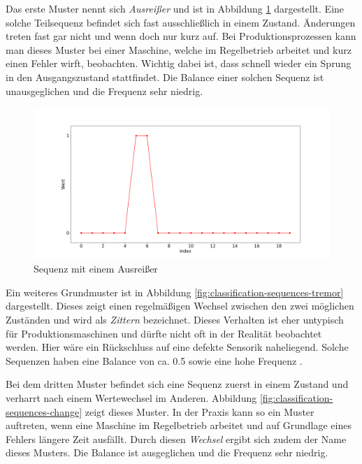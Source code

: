 Das erste Muster nennt sich \textit{Ausreißer} und ist in Abbildung \ref{fig:classification-sequences-outlier} dargestellt. Eine solche Teilsequenz befindet sich fast ausschließlich in einem Zustand. Änderungen treten fast gar nicht und wenn doch nur kurz auf. Bei Produktionsprozessen kann man dieses Muster bei einer Maschine, welche im Regelbetrieb arbeitet und kurz einen Fehler wirft, beobachten. Wichtig dabei ist, dass schnell wieder ein Sprung in den Ausgangszustand stattfindet. Die Balance einer solchen Sequenz ist unausgeglichen und die Frequenz sehr niedrig.

\begin{figure}[H]
	\centering
	\includegraphics[scale=0.32]{images/sequences/outlier}
	\caption{Sequenz mit einem Ausreißer}
	\label{fig:classification-sequences-outlier}
\end{figure}

Ein weiteres Grundmuster ist in Abbildung \ref{fig:classification-sequences-tremor} dargestellt. Dieses zeigt einen regelmäßigen Wechsel zwischen den zwei möglichen Zuständen und wird als \textit{Zittern} bezeichnet. Dieses Verhalten ist eher untypisch für Produktionsmaschinen und dürfte nicht oft in der Realität beobachtet werden. Hier wäre ein Rückschluss auf eine defekte Sensorik naheliegend. Solche Sequenzen haben eine Balance von ca. 0.5 sowie eine hohe Frequenz .

Bei dem dritten Muster befindet sich eine Sequenz zuerst in einem Zustand und verharrt nach einem Wertewechsel im Anderen. Abbildung \ref{fig:classification-sequences-change} zeigt dieses Muster. In der Praxis kann so ein Muster auftreten, wenn eine Maschine im Regelbetrieb arbeitet und auf Grundlage eines Fehlers längere Zeit ausfällt. Durch diesen \textit{Wechsel} ergibt sich zudem der Name dieses Musters. Die Balance ist ausgeglichen und die Frequenz sehr niedrig.

